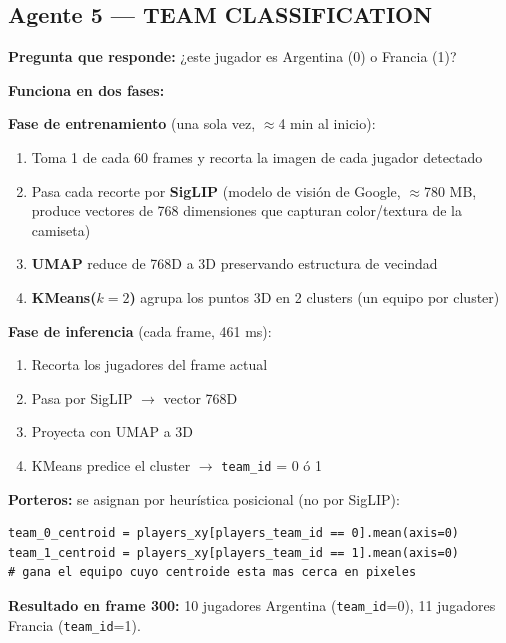 \documentclass[11pt,a4paper]{article}
\begin{document}
\subsection{Agente 5 — TEAM CLASSIFICATION}

\textbf{Pregunta que responde:} ¿este jugador es Argentina (0) o Francia (1)?

\textbf{Funciona en dos fases:}

\textbf{Fase de entrenamiento} (una sola vez, $\approx$4 min al inicio):
\begin{enumerate}[noitemsep]
  \item Toma 1 de cada 60 frames y recorta la imagen de cada jugador detectado
  \item Pasa cada recorte por \textbf{SigLIP} (modelo de visión de Google,
        $\approx$780 MB, produce vectores de 768 dimensiones que capturan
        color/textura de la camiseta)
  \item \textbf{UMAP} reduce de 768D a 3D preservando estructura de vecindad
  \item \textbf{KMeans($k=2$)} agrupa los puntos 3D en 2 clusters
        (un equipo por cluster)
\end{enumerate}

\textbf{Fase de inferencia} (cada frame, 461 ms):
\begin{enumerate}[noitemsep]
  \item Recorta los jugadores del frame actual
  \item Pasa por SigLIP $\to$ vector 768D
  \item Proyecta con UMAP a 3D
  \item KMeans predice el cluster $\to$ \texttt{team\_id} = 0 ó 1
\end{enumerate}

\textbf{Porteros:} se asignan por heurística posicional (no por SigLIP):

\begin{lstlisting}[caption={Heurística de porteros — sports/examples/soccer/main.py}]
team_0_centroid = players_xy[players_team_id == 0].mean(axis=0)
team_1_centroid = players_xy[players_team_id == 1].mean(axis=0)
# gana el equipo cuyo centroide esta mas cerca en pixeles
\end{lstlisting}

\textbf{Resultado en frame 300:} 10 jugadores Argentina (\texttt{team\_id}=0),
11 jugadores Francia (\texttt{team\_id}=1).
\end{document}
